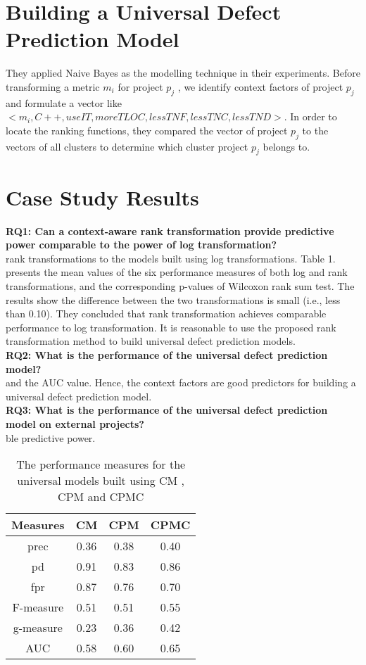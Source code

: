 \section{Building a Universal Defect Prediction Model}
They applied Naive Bayes as the modelling technique in their experiments. Before transforming a metric $m_{i}$ for project $p_{j}$ , we identify context factors of project $p_{j}$ and formulate a vector like $< m_{i}, C++, useIT, moreT LOC, lessT NF, lessT NC, lessT ND >$.  In order to locate the ranking functions, they compared the vector of project $p_{j}$ to the vectors of all clusters to determine which cluster project $p_{j}$ belongs to.

\section{Case Study Results}
\textbf{RQ1: Can a context-aware rank transformation provide predictive power comparable to the power of log transformation?}\\
rank transformations to the models built using log transformations. Table 1. presents the mean values of the six performance measures of both log and rank transformations, and the corresponding p-values of Wilcoxon rank sum test. The
results show the difference between the two transformations is small (i.e., less than 0.10). They concluded that rank transformation achieves comparable performance to log transformation. It is reasonable to use the proposed rank transformation method to build universal defect prediction models.\\
\textbf{RQ2: What is the performance of the universal defect
prediction model?}\\
and the AUC value. Hence, the context factors are good predictors for building a universal defect prediction model.\\
\textbf{RQ3: What is the performance of the universal defect prediction model on external projects?}\\
ble predictive power.


\begin{table}
\begin{center}
\caption{The performance measures for the universal models built using CM , CPM and CPMC}
 \begin{tabular}{|c c c c |} 
 \hline
 \textbf{Measures} & \textbf{CM} & \textbf{CPM} & \textbf{CPMC}\\ [0.5ex] 
 \hline
 prec & 0.36 & 0.38 & 0.40 \\ 
 \hline
 pd & 0.91 & 0.83 & 0.86 \\
 \hline
 fpr & 0.87 & 0.76 & 0.70 \\
 \hline
 F-measure & 0.51 & 0.51 & 0.55\\
 \hline
 g-measure & 0.23 & 0.36 & 0.42\\
 \hline
 AUC & 0.58 & 0.60 & 0.65\\ [1ex] 
 \hline
\end{tabular}
\end{center}
\end{table}

